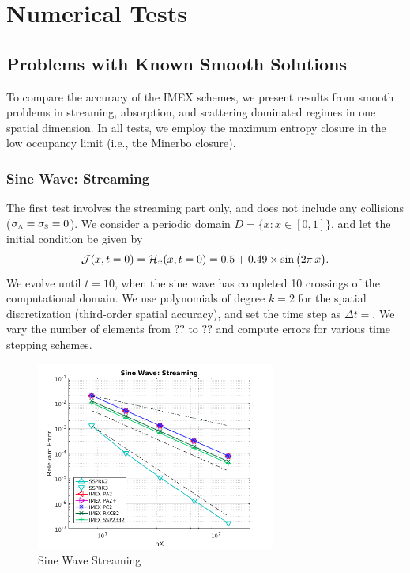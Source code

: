 \section{Numerical Tests}
\label{sec:numerical}

\subsection{Problems with Known Smooth Solutions}
\label{sec:smoothProblems}

To compare the accuracy of the IMEX schemes, we present results from smooth problems in streaming, absorption, and scattering dominated regimes in one spatial dimension.  
In all tests, we employ the maximum entropy closure in the low occupancy limit (i.e., the Minerbo closure).  

\subsubsection{Sine Wave: Streaming}

The first test involves the streaming part only, and does not include any collisions ($\sigma_{\mbox{\tiny A}}=\sigma_{\mbox{\tiny S}}=0$).  
We consider a periodic domain $D=\{x:x\in[0,1]\}$, and let the initial condition be given by
\begin{equation}
  \mathcal{J}(x,t=0)=\mathcal{H}_{x}(x,t=0)=0.5+0.49\times\sin\big(2\pi\,x\big).  
\end{equation}
We evolve until $t=10$, when the sine wave has completed 10 crossings of the computational domain.  
We use polynomials of degree $k=2$ for the spatial discretization (third-order spatial accuracy), and set the time step as $\Delta t = $.  
We vary the number of elements from $??$ to $??$ and compute errors for various time stepping schemes.  


\begin{figure}[h]
  \centering
    \includegraphics[width=0.7\textwidth]{figures/SineWaveStreaming}
   \caption{Sine Wave Streaming}
  \label{fig:SineWaveStreaming}
\end{figure}

